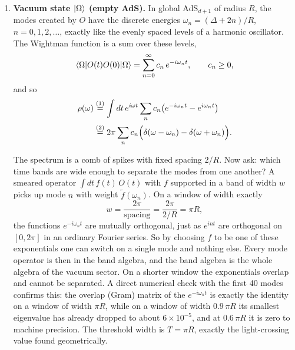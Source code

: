 \begin{enumerate}
\item \textbf{Vacuum state $\ket\Omega$ (empty AdS).}
In global $\text{AdS}_{d+1}$ of radius $R$, the modes created by $O$ have the discrete energies
$\omega_n = (\Delta + 2n)/R$, $n=0,1,2,\dots$, exactly like the evenly spaced levels of a harmonic oscillator.
The Wightman function is a sum over these levels,
\[
\braket{\Omega|O(t)O(0)|\Omega} = \sum_{n=0}^\infty c_n\, e^{-i\omega_n t}, \qquad c_n\ge0 ,
\]
and so
\begin{align}
\rho(\omega)
&\overset{(1)}{=} \int dt\, e^{i\omega t} \sum_{n} c_n \big(e^{-i\omega_n t} - e^{i\omega_n t}\big) \notag\\
&\overset{(2)}{=} 2\pi \sum_{n} c_n \Big(\delta(\omega - \omega_n) - \delta(\omega + \omega_n)\Big) .
\label{eq:rho_vacuum_AdS}
\end{align}
\quad
{}

The spectrum is a comb of spikes with fixed spacing $2/R$. Now ask: which time bands are wide enough to
separate the modes from one another? A smeared operator $\int dt\, f(t)\,O(t)$ with $f$ supported in a band of
width $w$ picks up mode $n$ with weight $\tilde f(\omega_n)$. On a window of width exactly
\[
w = \frac{2\pi}{\text{spacing}} = \frac{2\pi}{2/R} = \pi R ,
\]
the functions $e^{-i\omega_n t}$ are mutually orthogonal, just as $e^{int}$ are orthogonal on
$[0,2\pi]$ in an ordinary Fourier series. So by choosing $f$ to be one of these exponentials one can switch on
a single mode and nothing else. Every mode operator is then in the band algebra, and the band algebra is the
whole algebra of the vacuum sector. On a shorter window the exponentials overlap and cannot be separated. A
direct numerical check with the first 40 modes confirms this: the overlap (Gram) matrix of the
$e^{-i\omega_n t}$ is exactly the identity on a window of width $\pi R$, while on a window of width $0.9\,\pi R$
its smallest eigenvalue has already dropped to about $6\times10^{-5}$, and at $0.6\,\pi R$ it is zero to
machine precision. The threshold width is $T=\pi R$, exactly the light-crossing value found geometrically.


\end{enumerate}
